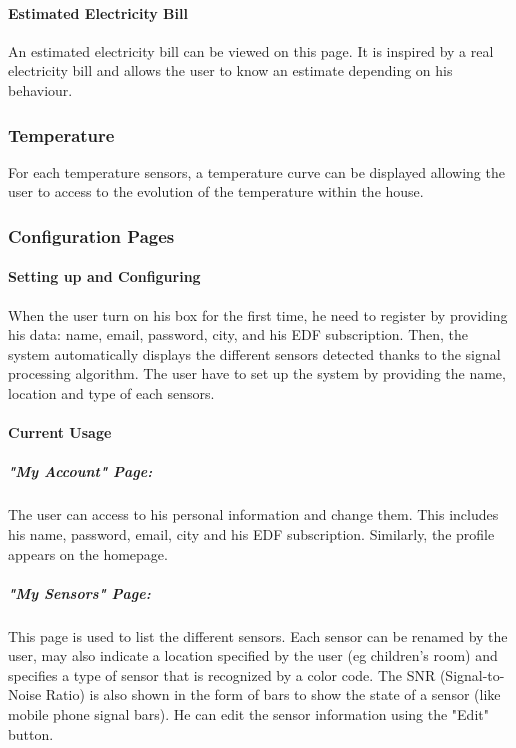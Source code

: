     \paragraph{Estimated Electricity Bill}
    An estimated electricity bill can be viewed on this page. It is inspired by a real electricity bill and allows the user to know an estimate depending on his behaviour.
\subsubsection{Temperature}
    For each temperature sensors, a temperature curve can be displayed allowing the user to access to the evolution of the temperature within the house. 
\subsubsection{Configuration Pages}
    
    \paragraph{Setting up and Configuring} %
    
    When the user turn on his box for the first time, he need to register by providing his data: name, email, password, city, and his EDF subscription. Then, the system automatically displays the different sensors detected thanks to the signal processing algorithm. The user have to set up the system by providing the name, location and type of each sensors. %
    
    \paragraph{Current Usage} %
    
    \subparagraph{"My Account" Page:} 
    The user can access to his personal information and change them. This includes his name, password, email, city and his EDF subscription. Similarly, the profile appears on the homepage.
    
    \subparagraph{"My Sensors" Page:}
    This page is used to list the different sensors. Each sensor can be renamed by the user, may also indicate a location specified by the user (eg children's room) and specifies a type of sensor that is recognized by a color code. The SNR (Signal-to-Noise Ratio) is also shown in the form of bars to show the state of a sensor (like mobile phone signal bars). He can edit the sensor information using the "Edit" button.